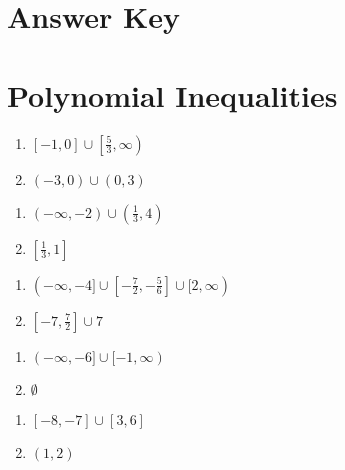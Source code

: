 \newpage

\section{Answer Key}

\section*{Polynomial Inequalities}
\begin{multicols}{2}
\begin{enumerate}
    \item $[-1,0] \cup \left[\frac{5}{3}, \infty\right)$
    \item $(-3,0) \cup (0,3)$
\end{enumerate} \setcounter{Review}{\value{enumi}}
\end{multicols}
\begin{multicols}{2}
\begin{enumerate}	\setcounter{enumi}{\value{Review}}
    \item $(-\infty, -2) \cup \left(\frac{1}{3}, 4\right)$
    \item $\left[\frac{1}{3}, 1\right]$
\end{enumerate} \setcounter{Review}{\value{enumi}}
\end{multicols}
\begin{multicols}{2}
\begin{enumerate}	\setcounter{enumi}{\value{Review}}
    \item $(-\infty, -4] \cup \left[-\frac{7}{2},-\frac{5}{6}\right] \cup [2, \infty)$
    \item $\left[-7, \frac{7}{2}\right] \cup {7}$
\end{enumerate} \setcounter{Review}{\value{enumi}}
\end{multicols}
\begin{multicols}{2}
\begin{enumerate}	\setcounter{enumi}{\value{Review}}
    \item $(-\infty, -6] \cup [-1, \infty)$
    \item $\emptyset$
\end{enumerate} \setcounter{Review}{\value{enumi}}
\end{multicols}
\begin{multicols}{2}
\begin{enumerate}	\setcounter{enumi}{\value{Review}}
    \item $[-8,-7] \cup [3, 6]$
    \item $(1,2)$
\end{enumerate} \setcounter{Review}{\value{enumi}}
\end{multicols}
